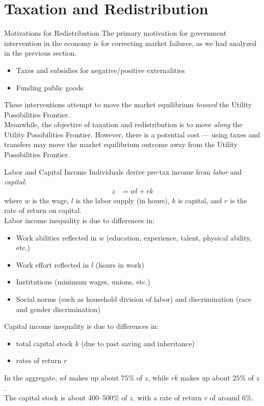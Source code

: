 \documentclass[8pt]{extarticle}
\begin{document}
  \section*{Taxation and Redistribution}%
  \begin{problem}{Motivations for Redistribution}
    The primary motivation for government intervention in the economy is for correcting market failures, as we had analyzed in the previous section.
    \begin{itemize}
      \item Taxes and subsidies for negative/positive externalities
      \item Funding public goods
    \end{itemize}
    These interventions attempt to move the market equilibrium \textit{toward} the Utility Possibilities Frontier.\\

    Meanwhile, the objective of taxation and redistribution is to move \textit{along} the Utility Possibilities Frontier. However, there is a potential cost --- using taxes and transfers may move the market equilibrium outcome away from the Utility Possibilities Frontier.
  \end{problem}
  \begin{problem}{Labor and Capital Income}
    Individuals derive pre-tax income from \textit{labor} and \textit{capital}:
    \begin{align*}
      z &= wl + rk
    \end{align*}
    where $w$ is the wage, $l$ is the labor supply (in hours), $k$ is capital, and $r$ is the rate of return on capital.\\

    Labor income inequality is due to differences in:
    \begin{itemize}
      \item Work abilities reflected in $w$ (education, experience, talent, physical ability, etc.)
      \item Work effort reflected in $l$ (hours in work)
      \item Institutions (minimum wages, unions, etc.)
      \item Social norms (such as household division of labor) and discrimination (race and gender discrimination)
    \end{itemize}
    Capital income inequality is due to differences in:
    \begin{itemize}
      \item total capital stock $k$ (due to past saving and inheritance)
      \item rates of return $r$
    \end{itemize}
    In the aggregate, $wl$ makes up about $75\%$ of $z$, while $rk$ makes up about $25\%$ of $z$.\\

    The capital stock is about 400--500\% of $z$, with a rate of return $r$ of around $6\%$.
  \end{problem}
\end{document}
